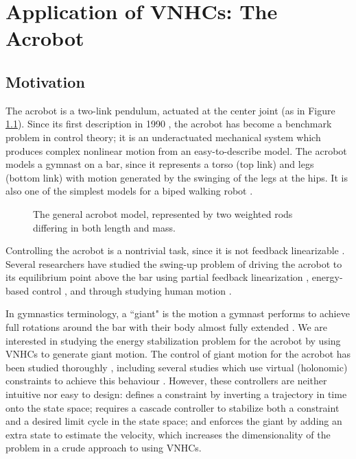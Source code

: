

\chapter{Application of VNHCs: The Acrobot}\label{ch:acrobot}
\section{Motivation}
The acrobot is a two-link pendulum, actuated at the center joint (as in Figure
\ref{fig:acrobot-model}). 
Since its first description in 1990
\cite{nonlinear_controllers_nonintegrable_acrobot}, the acrobot has become a
benchmark problem in control theory; 
it is an underactuated mechanical system which produces complex nonlinear motion
from an easy-to-describe model.
The acrobot models a gymnast on a bar, since it represents a torso (top link)
and legs (bottom link) with motion generated by the swinging of the legs at the
hips. 
It is also one of the simplest models for a biped walking robot
\cite{toward_framework_biped_locomotion}.

\begin{figure}
    \centering
    
    \caption{The general acrobot model, represented by two weighted rods
    differing in both length and mass.}%
    \label{fig:acrobot-model}
\end{figure}

Controlling the acrobot is a nontrivial task, since it is not feedback
linearizable \cite{nonlinear_controllers_nonintegrable_acrobot}. 
Several researchers have studied the swing-up problem of driving the acrobot to
its equilibrium point above the bar using partial feedback linearization
\cite{swingup_problem_acrobot}, energy-based control
\cite{swingup_acrobot_pendulum, swingup_acrobot_energy}, and through studying
human motion \cite{swingup_giant_acrobot, motion_control_gymnastic_skill}.

In gymnastics terminology, a ``giant" is the motion a gymnast performs to
achieve full rotations around the bar with their body almost fully extended
\cite{usagym_giant}. 
We are interested in studying the energy stabilization problem for the acrobot
by using VNHCs to generate giant motion. 
The control of giant motion for the acrobot has been studied thoroughly
\cite{energy_pumping_robotic_swinging, swingup_giant_acrobot,
control_giant_two_link_gymnastic_robot}, including several studies which use
virtual (holonomic) constraints to achieve this behaviour
\cite{dynamical_servo_acrobot_vc, control_giant_two_link_gymnastic_robot,
xingbo_thesis}. 
However, these controllers are neither intuitive nor easy to
design:
\cite{control_giant_two_link_gymnastic_robot} defines a constraint by inverting
a trajectory in time onto the state space; 
\cite{dynamical_servo_acrobot_vc} requires a cascade controller to stabilize
both a constraint and a desired limit cycle in the state space; 
and \cite{xingbo_thesis} enforces the giant by adding an extra state to estimate
the velocity, which increases the dimensionality of the problem in a crude
approach to using VNHCs.

